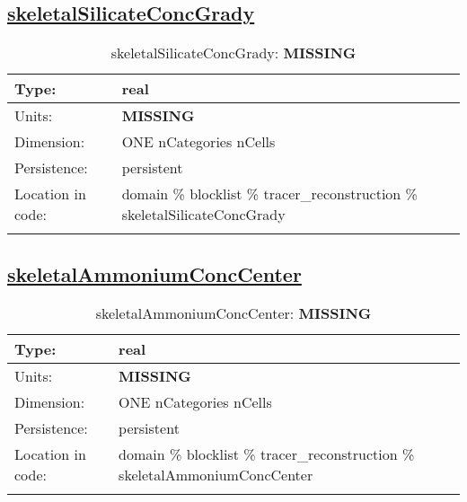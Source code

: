 \subsection[skeletalSilicateConcGrady]{\hyperref[sec:var_tab_tracer_reconstruction]{skeletalSilicateConcGrady}}
\label{subsec:var_sec_tracer_reconstruction_skeletalSilicateConcGrady}
\begin{center}
\begin{longtable}{| p{2.0in} | p{4.0in} |}
        \hline 
        Type: & real \\
        \hline 
        Units: & {\bf \color{red} MISSING} \\
        \hline 
        Dimension: & ONE nCategories nCells \\
        \hline 
        Persistence: & persistent \\
        \hline 
         Location in code: & domain \% blocklist \% tracer\_reconstruction \% skeletalSilicateConcGrady \\
         \hline 
    \caption{skeletalSilicateConcGrady: {\bf \color{red} MISSING}}
\end{longtable}
\end{center}
\subsection[skeletalAmmoniumConcCenter]{\hyperref[sec:var_tab_tracer_reconstruction]{skeletalAmmoniumConcCenter}}
\label{subsec:var_sec_tracer_reconstruction_skeletalAmmoniumConcCenter}
\begin{center}
\begin{longtable}{| p{2.0in} | p{4.0in} |}
        \hline 
        Type: & real \\
        \hline 
        Units: & {\bf \color{red} MISSING} \\
        \hline 
        Dimension: & ONE nCategories nCells \\
        \hline 
        Persistence: & persistent \\
        \hline 
         Location in code: & domain \% blocklist \% tracer\_reconstruction \% skeletalAmmoniumConcCenter \\
         \hline 
    \caption{skeletalAmmoniumConcCenter: {\bf \color{red} MISSING}}
\end{longtable}
\end{center}
